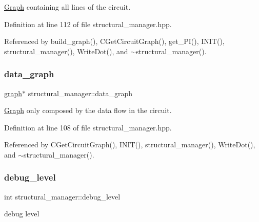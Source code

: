 \hyperlink{structGraph}{Graph} containing all lines of the circuit. 



Definition at line 112 of file structural\+\_\+manager.\+hpp.



Referenced by build\+\_\+graph(), C\+Get\+Circuit\+Graph(), get\+\_\+\+P\+I(), I\+N\+I\+T(), structural\+\_\+manager(), Write\+Dot(), and $\sim$structural\+\_\+manager().

\mbox{\label{classstructural__manager_a252780856f661284bc23989c96ccffd9}} 
\subsubsection{\texorpdfstring{data\+\_\+graph}{data\_graph}}
{\footnotesize\ttfamily \hyperlink{structgraph}{graph}$\ast$ structural\+\_\+manager\+::data\+\_\+graph\hspace{0.3cm}{\ttfamily [private]}}



\hyperlink{structGraph}{Graph} only composed by the data flow in the circuit. 



Definition at line 108 of file structural\+\_\+manager.\+hpp.



Referenced by C\+Get\+Circuit\+Graph(), I\+N\+I\+T(), structural\+\_\+manager(), Write\+Dot(), and $\sim$structural\+\_\+manager().

\mbox{\label{classstructural__manager_a43c8b12b9806d6d14d35b7ce1bc2694e}} 
\subsubsection{\texorpdfstring{debug\+\_\+level}{debug\_level}}
{\footnotesize\ttfamily int structural\+\_\+manager\+::debug\+\_\+level\hspace{0.3cm}{\ttfamily [private]}}



debug level 



